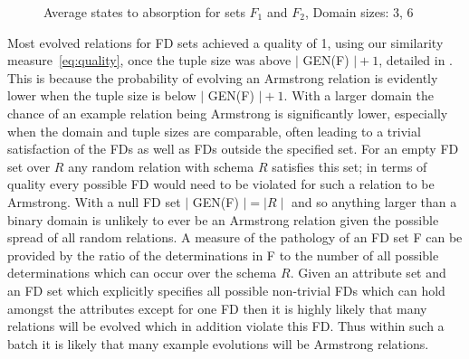 \begin{figure}
\centerline{}
\caption{\label{graph:16_82}{Average states to absorption for sets $F_1$ and $F_2$, Domain sizes: 3, 6}}
\end{figure}
Most evolved relations for FD sets achieved a quality of 1, using
our similarity measure~\ref{eq:quality}, once the
tuple size was above $\mid$ GEN(F) $\mid + 1$, detailed in \cite{cl96}.
 This is because the probability
of evolving an Armstrong relation is evidently lower when the tuple size
 is below
$\mid$ GEN(F) $\mid + 1$. With a larger domain the chance of an example
relation being Armstrong is significantly lower, especially when the
domain and tuple sizes are comparable, often leading to a trivial
satisfaction of the FDs as well as FDs outside the specified set.
For an empty FD set over $R$ any random relation with schema $R$ satisfies this set;
in terms of quality every possible FD would need to be violated for such
a relation to be Armstrong.
 With a null FD set $\mid$ GEN(F) $\mid = \mid R \mid$ and so
anything larger than a binary domain is unlikely to ever be an Armstrong
relation given the possible spread of all random relations. A measure
of the pathology of an FD set F can be
 provided by the ratio
of the determinations in F to the number of all possible determinations
which can occur over the schema $R$.
Given an attribute set and an FD set
which explicitly specifies all possible non-trivial FDs which
can hold amongst the attributes except for one FD then it is highly likely that
many relations will be evolved which in addition violate this FD. Thus within
such a batch it is likely that many example evolutions will be Armstrong
relations. 

\medskip

